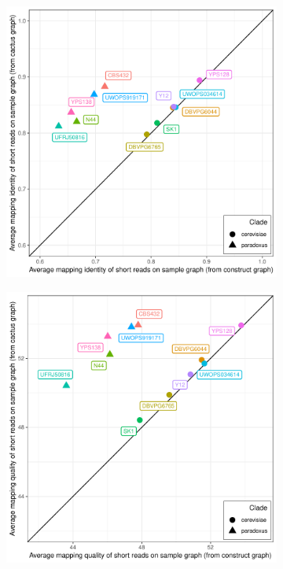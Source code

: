 \documentclass{article}
\begin{document}
\clearpage
\begin{figure}
  \begin{subfigure}[b]{.5\textwidth}
    \caption{}
    \includegraphics[width=\textwidth]{pdf/yeast-genotyping-identity-all.pdf}
  \end{subfigure}
  \begin{subfigure}[b]{.5\textwidth}
    \caption{}
    \includegraphics[width=\textwidth]{pdf/yeast-genotyping-quality-all.pdf}
  \end{subfigure}
\end{figure}
\end{document}
